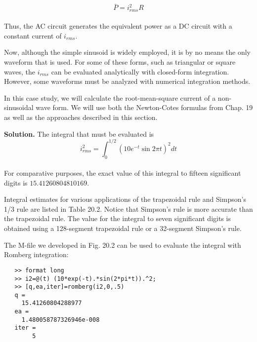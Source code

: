 \documentclass[../main.tex]{subfiles}
\begin{document}
	$$\bar{P} = i^{2}_{rms}R$$\\
Thus, the AC circuit generates the equivalent power as a DC circuit with a constant current
of $i_{rms}$.

Now, although the simple sinusoid is widely employed, it is by no means the only
waveform that is used. For some of these forms, such as triangular or square waves, the $i_{rms}$
can be evaluated analytically with closed-form integration. However, some waveforms
must be analyzed with numerical integration methods.

In this case study, we will calculate the root-mean-square current of a non-sinusoidal
wave form. We will use both the Newton-Cotes formulas from Chap. 19 as well as the
approaches described in this section.

\textbf{Solution.} The integral that must be evaluated is
\begin{equation}
	\tag{20.35}
	i^{2}_{rms} = \int^{1/2}_{0} (10e^{-t} \sin 2\pi t)^{2} dt
\end{equation}\\
For comparative purposes, the exact value of this integral to fifteen significant digits is
$15.41260804810169$.

Integral estimates for various applications of the trapezoidal rule and Simpson's 1/3
rule are listed in Table 20.2. Notice that Simpson's rule is more accurate than the trapezoidal
rule. The value for the integral to seven significant digits is obtained using a 128-segment
trapezoidal rule or a 32-segment Simpson's rule.
	
The M-file we developed in Fig. 20.2 can be used to evaluate the integral with
Romberg integration:

\begin{verbatim}
   >> format long
   >> i2=@(t) (10*exp(-t).*sin(2*pi*t)).^2;
   >> [q,ea,iter]=romberg(i2,0,.5)
   q =
     15.41260804288977
   ea =
     1.480058787326946e-008
   iter =
        5
\end{verbatim}
\end{document}
